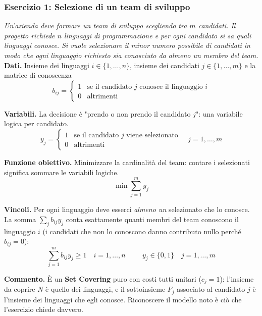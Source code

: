 \documentclass[12pt]{extarticle} %
\begin{document}
\subsubsection{Esercizio 1: Selezione di un team di sviluppo}
\textit{Un'azienda deve formare un team di sviluppo scegliendo tra $m$ candidati. Il progetto richiede $n$ linguaggi di programmazione e per ogni candidato si sa quali linguaggi conosce. Si vuole selezionare il minor numero possibile di candidati in modo che ogni linguaggio richiesto sia conosciuto da almeno un membro del team.}\\

\noindent\textbf{Dati.} Insieme dei linguaggi $i \in \{1,\dots,n\}$, insieme dei candidati $j \in \{1,\dots,m\}$ e la matrice di conoscenza
\[
b_{ij} = \begin{cases} 1 & \text{se il candidato } j \text{ conosce il linguaggio } i\\ 0 & \text{altrimenti}\end{cases}
\]

\noindent\textbf{Variabili.} La decisione è "prendo o non prendo il candidato $j$": una variabile logica per candidato.
\[
y_j = \begin{cases} 1 & \text{se il candidato } j \text{ viene selezionato}\\ 0 & \text{altrimenti}\end{cases} \quad j=1,\dots,m
\]

\noindent\textbf{Funzione obiettivo.} Minimizzare la cardinalità del team: contare i selezionati significa sommare le variabili logiche.
\[
\min \sum_{j=1}^m y_j
\]

\noindent\textbf{Vincoli.} Per ogni linguaggio deve esserci \textit{almeno un} selezionato che lo conosce. La somma $\sum_j b_{ij}y_j$ conta esattamente quanti membri del team conoscono il linguaggio $i$ (i candidati che non lo conoscono danno contributo nullo perché $b_{ij}=0$):
\[
\sum_{j=1}^m b_{ij} y_j \ge 1 \quad i=1,\dots,n \hspace{1cm} y_j \in \{0,1\} \quad j=1,\dots,m
\]

\noindent\textbf{Commento.} È un \textbf{Set Covering} puro con costi tutti unitari ($c_j=1$): l'insieme da coprire $N$ è quello dei linguaggi, e il sottoinsieme $F_j$ associato al candidato $j$ è l'insieme dei linguaggi che egli conosce. Riconoscere il modello noto è ciò che l'esercizio chiede davvero.
\end{document}
